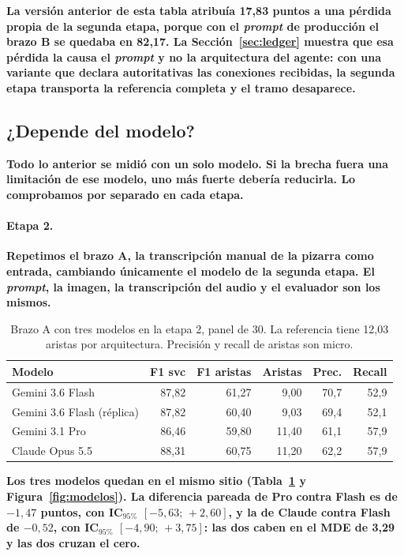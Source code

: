 \documentclass[a4paper, twocolumn, 10pt]{IEEEtran}
\newcommand{\nuevo}[1]{{\bfseries #1}}
\begin{document}
\nuevo{La versión anterior de esta tabla atribuía 17,83 puntos a una pérdida propia de la segunda etapa, porque con el \emph{prompt} de producción el brazo B se quedaba en 82,17. La Sección~\ref{sec:ledger} muestra que esa pérdida la causa el \emph{prompt} y no la arquitectura del agente: con una variante que declara autoritativas las conexiones recibidas, la segunda etapa transporta la referencia completa y el tramo desaparece.}

\subsection{\nuevo{¿Depende del modelo?}}
\label{sec:modelos}

\nuevo{Todo lo anterior se midió con un solo modelo. Si la brecha fuera una
limitación de ese modelo, uno más fuerte debería reducirla. Lo comprobamos por
separado en cada etapa.}

\paragraph{\nuevo{Etapa 2.}} \nuevo{Repetimos el brazo A, la transcripción manual de la
pizarra como entrada, cambiando únicamente el modelo de la segunda etapa. El
\emph{prompt}, la imagen, la transcripción del audio y el evaluador son los
mismos.}

\begin{table}[H]
\centering\footnotesize\setlength{\tabcolsep}{3pt}\bfseries
\caption{Brazo A con tres modelos en la etapa 2, panel de 30. La referencia tiene
12,03 aristas por arquitectura. Precisión y recall de aristas son micro.}
\label{tab:modelos}
\begin{tabular}{lrrrrr}
\toprule
Modelo & F1 svc & F1 aristas & Aristas & Prec. & Recall\\
\midrule
Gemini 3.6 Flash            & 87,82 & 61,27 & 9,00  & 70,7 & 52,9\\
Gemini 3.6 Flash (réplica)  & 87,82 & 60,40 & 9,03  & 69,4 & 52,1\\
Gemini 3.1 Pro              & 86,46 & 59,80 & 11,40 & 61,1 & 57,9\\
Claude Opus 5.5             & 88,31 & 60,75 & 11,20 & 62,2 & 57,9\\
\bottomrule
\end{tabular}
\end{table}

\nuevo{Los tres modelos quedan en el mismo sitio (Tabla~\ref{tab:modelos} y
Figura~\ref{fig:modelos}). La diferencia pareada de Pro contra Flash es de
$-1{,}47$ puntos, con IC$_{95\%}$ $[-5{,}63;\,+2{,}60]$, y la de Claude contra
Flash de $-0{,}52$, con IC$_{95\%}$ $[-4{,}90;\,+3{,}75]$: las dos caben en el MDE
de 3,29 y las dos cruzan el cero.}
\end{document}
